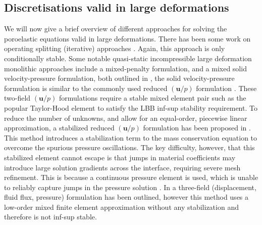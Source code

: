 \subsection{Discretisations valid in large deformations}


We will now give a brief overview of different approaches for solving the poroelastic equations valid in large deformations. There has been some work on operating splitting (iterative) approaches \citep{chapelle2010poroelastic}. Again, this approach is only conditionally stable. Some notable quasi-static incompressible large deformation monolithic approaches include a mixed-penalty formulation, and a mixed solid velocity-pressure formulation, both outlined in \citep{almeida1998finite}, the solid velocity-pressure formulation is similar to the commonly used reduced $(\boldsymbol{u}/p)$ formulation \citep{ateshian2010finite}. These two-field $(\boldsymbol{u}/p)$ formulations require a stable mixed element pair such as the popular Taylor-Hood element to satisfy the LBB inf-sup stability requirement. To reduce the number of unknowns, and allow for an equal-order, piecewise linear approximation, a stabilized reduced $(\boldsymbol{u}/ p)$ formulation has been proposed in \citep{white2008stabilized}. This method introduces a stabilization term to the mass conservation equation to overcome the spurious pressure oscillations. The key difficulty, however, that this stabilized element cannot escape is that jumps in material coefficients may introduce large solution gradients across the
interface, requiring severe mesh refinement. This is because a continuous pressure element is used, which is unable to reliably capture jumps in the pressure solution \citep{white2008stabilized}. In \citep{levenston1998variationally} a three-field (displacement, fluid flux, pressure) formulation has been outlined, however this method uses a low-order mixed finite element approximation without any stabilization and therefore is not inf-sup stable.





 